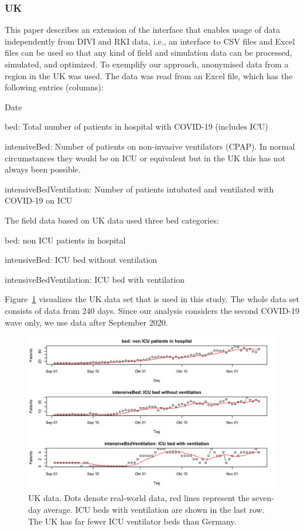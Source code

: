\documentclass[conference]{IEEEtran}
\begin{document}
\subsubsection{UK}
This paper describes an extension of the interface that enables usage of data independently from \gls{DIVI} and \gls{RKI} data, i.e., an interface to \gls{CSV} files and Excel files can be used so that any kind of field and simulation data can be processed, simulated, and optimized.
To exemplify our approach, anonymised data from a region in the UK was used. 
The data was read from an Excel file, which has the following entries (columns):
\begin{compactitem}
\item Date
\item bed: Total number of patients in hospital with \gls{COVID-19} (includes ICU)
\item intensiveBed: Number of patients on non-invasive ventilators (CPAP). In normal circumstances they would be on ICU or equivalent but in the UK this has not always been possible.
\item intensiveBedVentilation: Number of patients intubated and ventilated with \gls{COVID-19} on ICU
\end{compactitem}
The field data based on UK data used three bed categories: 
\begin{compactenum}
\item bed: non ICU patients in hospital
\item intensiveBed: ICU bed without ventilation
\item intensiveBedVentilation: \gls{ICU} bed with ventilation
\end{compactenum}
Figure~\ref{fig:ukdata} visualizes the UK data set that is used in this study. The whole data set consists of data from 240 days. Since our analysis considers the second \gls{COVID-19} wave only, we use data after September 2020.
\begin{figure}
    \centering
    \includegraphics[width=0.75\linewidth]{ukdata3.png}
    \caption{UK data. Dots denote real-world data, red lines represent the seven-day average. \gls{ICU} beds with ventilation are shown in the last row. The UK has far fewer \gls{ICU} ventilator beds than Germany.}
\label{fig:ukdata}
\end{figure}
\end{document}
